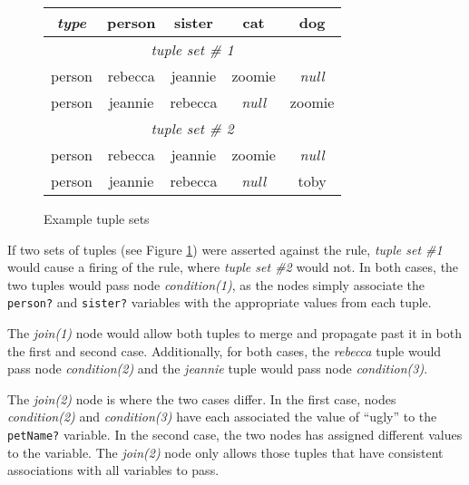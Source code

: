\setlength{\extrarowheight}{3pt}


\begin{figure}[htbpc]
  \begin{center}
    \begin{tabular}{|c||c|c|c|c|}
      \hline
        \emph{\textsf{type}} %
            & \textsf{person} %
            & \textsf{sister} %
            & \textsf{cat} %
            & \textsf{dog} \\
      \hline
      \hline
        \multicolumn{5}{|c|}{\emph{tuple set \# 1}}\\
      \hline 
      \hline 
        person & rebecca & jeannie & zoomie & \emph{null} \\
      \hline
        person & jeannie & rebecca & \emph{null} & zoomie \\
      \hline
      \hline
        \multicolumn{5}{|c|}{\emph{tuple set \# 2}}\\
      \hline
      \hline
        person & rebecca & jeannie & zoomie & \emph{null} \\
      \hline
        person & jeannie & rebecca & \emph{null} & toby \\
      \hline
    \end{tabular}
  \end{center}

  \caption{Example tuple sets}
  \label{table.tuplesets}
\end{figure}

\clearpage

If two sets of tuples (see Figure \ref{table.tuplesets}) were
asserted against the rule, \emph{tuple set \#1} would cause a firing
of the rule, where \emph{tuple set \#2} would not.  In both cases,
the two tuples would pass node \emph{condition(1)}, as the
nodes simply associate the \verb|person?| and \verb|sister?| variables
with the appropriate values from each tuple.

The \emph{join(1)} node would allow both tuples to merge and
propagate past it in both the first and second case.  Additionally,
for both cases, the \emph{rebecca} tuple would pass node
\emph{condition(2)}
and the \emph{jeannie} tuple would pass node \emph{condition(3)}.

The \emph{join(2)} node is where the two cases differ.  In the first
case, nodes \emph{condition(2)} and \emph{condition(3)} have each associated the value
of ``ugly'' to the \verb|petName?| variable.  In the second case, the
two nodes has assigned different values to the variable.  The
\emph{join(2)} node only allows those tuples that have consistent
associations with all variables to pass.

